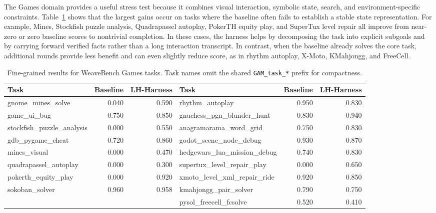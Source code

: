 The Games domain provides a useful stress test because it combines visual interaction, symbolic state, search, and environment-specific constraints. Table~\ref{tab:weavebench-game-breakdown} shows that the largest gains occur on tasks where the baseline often fails to establish a stable state representation. For example, Mines, Stockfish puzzle analysis, Quadrapassel autoplay, PokerTH equity play, and SuperTux level repair all improve from near-zero or zero baseline scores to nontrivial completion. In these cases, the harness helps by decomposing the task into explicit subgoals and by carrying forward verified facts rather than a long interaction transcript. In contrast, when the baseline already solves the core task, additional rounds provide less benefit and can even slightly reduce score, as in rhythm autoplay, X-Moto, KMahjongg, and FreeCell.

\begin{table}[t]
\caption{Fine-grained results for WeaveBench Games tasks. Task names omit the shared \texttt{GAM\_task\_*} prefix for compactness.}
\label{tab:weavebench-game-breakdown}
\centering
\scriptsize
\setlength{\tabcolsep}{4pt}
\begin{tabular}{lrr@{\hspace{1.2em}}lrr}
\toprule
Task & Baseline & LH-Harness & Task & Baseline & LH-Harness \\
\midrule
gnome\_mines\_solve & 0.040 & 0.590 & rhythm\_autoplay & 0.950 & 0.830 \\
game\_ui\_bug & 0.750 & 0.850 & gnuchess\_pgn\_blunder\_hunt & 0.830 & 0.940 \\
stockfish\_puzzle\_analysis & 0.000 & 0.550 & anagramarama\_word\_grid & 0.750 & 0.830 \\
gdb\_pygame\_cheat & 0.720 & 0.860 & godot\_scene\_node\_debug & 0.930 & 0.870 \\
mines\_visual & 0.000 & 0.470 & hedgewars\_lua\_mission\_debug & 0.740 & 0.830 \\
quadrapassel\_autoplay & 0.000 & 0.300 & supertux\_level\_repair\_play & 0.000 & 0.650 \\
pokerth\_equity\_play & 0.000 & 0.920 & xmoto\_level\_xml\_repair\_ride & 0.920 & 0.850 \\
sokoban\_solver & 0.960 & 0.958 & kmahjongg\_pair\_solver & 0.790 & 0.750 \\
 & & & pysol\_freecell\_fcsolve & 0.520 & 0.410 \\
\bottomrule
\end{tabular}
\end{table}

